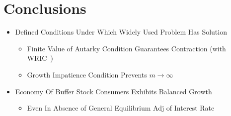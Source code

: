 \documentclass[pdflatex]{beamer}\providecommand{\texname}{BufferStockTheory-Slides}%
\newcommand{\WRIC}{\mbox{WRIC~}}
\begin{document}
\section{Conclusions}
\begin{frame}

\begin{itemize}
\item Defined Conditions Under Which Widely Used Problem Has Solution
\begin{itemize}
\item Finite Value of Autarky Condition Guarantees Contraction (with \WRIC)
\item Growth Impatience Condition Prevents $m \rightarrow \infty$
\end{itemize}
\item Economy Of Buffer Stock Consumers Exhibits Balanced Growth
\begin{itemize}
\item Even In Absence of General Equilibrium Adj of Interest Rate
\end{itemize}
\end{itemize}

\end{frame}

\def\newblock{\hskip .11em plus .33em minus .07em}

\begin{frame}

\renewcommand{\bibsection}{\subsubsection*{\bibname }}

\tiny 



\end{frame}
\end{document}
